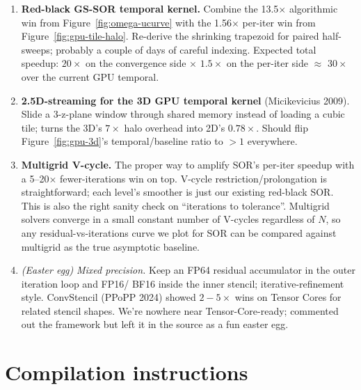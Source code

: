 \documentclass[11pt]{article}
\begin{document}
\begin{enumerate}[leftmargin=1.4em,itemsep=2pt,topsep=2pt]
  \item \textbf{Red-black GS-SOR temporal kernel.}  Combine the
        13.5$\times$ algorithmic win from Figure~\ref{fig:omega-ucurve}
        with the 1.56$\times$ per-iter win from
        Figure~\ref{fig:gpu-tile-halo}.  Re-derive the shrinking
        trapezoid for paired half-sweeps; probably a couple of days
        of careful indexing.  Expected total speedup: $20\times$ on
        the convergence side $\times$ $1.5\times$ on the per-iter
        side $\approx$ $30\times$ over the current GPU temporal.
  \item \textbf{2.5D-streaming for the 3D GPU temporal kernel}
        (Micikevicius 2009).  Slide a 3-z-plane window through
        shared memory instead of loading a cubic tile; turns the
        3D's $7\times$ halo overhead into 2D's $0.78\times$.  Should
        flip Figure~\ref{fig:gpu-3d}'s temporal/baseline ratio to
        $> 1$ everywhere.
  \item \textbf{Multigrid V-cycle.}  The proper way to amplify SOR's
        per-iter speedup with a 5--20$\times$ fewer-iterations win
        on top.  V-cycle restriction/prolongation is straightforward;
        each level's smoother is just our existing red-black SOR.
        This is also the right sanity check on ``iterations to
        tolerance''. Multigrid solvers converge in a small
        constant number of V-cycles regardless of $N$, so any
        residual-vs-iterations curve we plot for SOR can be
        compared against multigrid as the true asymptotic
        baseline.
  \item \textit{(Easter egg)} \textit{Mixed precision.}  Keep an FP64
        residual accumulator in the outer iteration loop and FP16/
        BF16 inside the inner stencil; iterative-refinement style.
        ConvStencil (PPoPP 2024) showed $2{-}5\times$ wins on Tensor
        Cores for related stencil shapes.  We're nowhere near
        Tensor-Core-ready; commented out the framework but left it
        in the source as a fun easter egg.
\end{enumerate}

\section{Compilation instructions}
\end{document}
